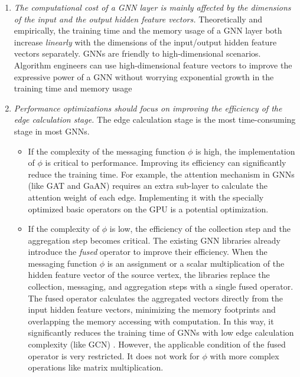 \begin{enumerate}
    \item \emph{The computational cost of a GNN layer is mainly affected by the dimensions of the input and the output hidden feature vectors.}
          Theoretically and empirically, the training time and the memory usage of a GNN layer both increase \emph{linearly} with the dimensions of the input/output hidden feature vectors separately.
          GNNs are friendly to high-dimensional scenarios. 
          Algorithm engineers can use high-dimensional feature vectors to improve the expressive power of a GNN without worrying exponential growth in the training time and memory usage
    \item \emph{Performance optimizations should focus on improving the efficiency of the edge calculation stage.}
          The edge calculation stage is the most time-consuming stage in most GNNs.
          \begin{itemize}
              \item If the complexity of the messaging function $\phi$ is high, the implementation of $\phi$ is critical to performance.
                    Improving its efficiency can significantly reduce the training time.
                    For example, the attention mechanism in GNNs (like GAT and GaAN) requires an extra sub-layer to calculate the attention weight of each edge.
                    Implementing it with the specially optimized basic operators on the GPU is a potential optimization.
              \item If the complexity of $\phi$ is low, the efficiency of the collection step and the aggregation step becomes critical.
                    The existing GNN libraries \cite{DGL, PyG, ma2019_neugraph} already introduce the \emph{fused} operator to improve their efficiency.
                    When the messaging function $\phi$ is an assignment or a scalar multiplication of the hidden feature vector of the source vertex, the libraries replace the collection, messaging, and aggregation steps with a single fused operator.
                    The fused operator calculates the aggregated vectors directly from the input hidden feature vectors, minimizing the memory footprints and overlapping the memory accessing with computation.
                    In this way, it significantly reduces the training time of GNNs with low edge calculation complexity (like GCN) \cite{yan2020_characterizing_gcn, zhang2020_analysis_neugraph}.
                    However, the applicable condition of the fused operator is very restricted.
                    It does not work for $\phi$ with more complex operations like matrix multiplication.

\end{itemize}
\end{enumerate}
